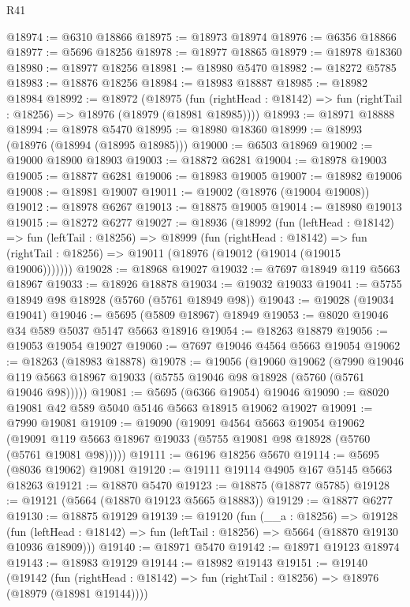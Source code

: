 \begin{lexlean}{R41}
\begin{coremodule}
@18974 := @6310 @18866
@18975 := @18973 @18974
@18976 := @6356 @18866
@18977 := @5696 @18256
@18978 := @18977 @18865
@18979 := @18978 @18360
@18980 := @18977 @18256
@18981 := @18980 @5470
@18982 := @18272 @5785
@18983 := @18876 @18256
@18984 := @18983 @18887
@18985 := @18982 @18984
@18992 := @18972
    (@18975
      (fun (rightHead : @18142) => fun (rightTail : @18256) => @18976 (@18979 (@18981 @18985))))
@18993 := @18971 @18888
@18994 := @18978 @5470
@18995 := @18980 @18360
@18999 := @18993 (@18976 (@18994 (@18995 @18985)))
@19000 := @6503 @18969
@19002 := @19000 @18900 @18903
@19003 := @18872 @6281
@19004 := @18978 @19003
@19005 := @18877 @6281
@19006 := @18983 @19005
@19007 := @18982 @19006
@19008 := @18981 @19007
@19011 := @19002 (@18976 (@19004 @19008))
@19012 := @18978 @6267
@19013 := @18875 @19005
@19014 := @18980 @19013
@19015 := @18272 @6277
@19027 := @18936
    (@18992
      (fun (leftHead : @18142) =>
      fun (leftTail : @18256) =>
      @18999
        (fun (rightHead : @18142) =>
        fun (rightTail : @18256) => @19011 (@18976 (@19012 (@19014 (@19015 @19006)))))))
@19028 := @18968 @19027
@19032 := @7697 @18949 @119 @5663 @18967
@19033 := @18926 @18878
@19034 := @19032 @19033
@19041 := @5755 @18949 @98 @18928 (@5760 (@5761 @18949 @98))
@19043 := @19028 (@19034 @19041)
@19046 := @5695 (@5809 @18967) @18949
@19053 := @8020 @19046 @34 @589 @5037 @5147 @5663 @18916
@19054 := @18263 @18879
@19056 := @19053 @19054 @19027
@19060 := @7697 @19046 @4564 @5663 @19054
@19062 := @18263 (@18983 @18878)
@19078 := @19056
    (@19060
      @19062
      (@7990 @19046 @119 @5663 @18967 @19033 (@5755 @19046 @98 @18928 (@5760 (@5761 @19046 @98)))))
@19081 := @5695 (@6366 @19054) @19046
@19090 := @8020 @19081 @42 @589 @5040 @5146 @5663 @18915 @19062 @19027
@19091 := @7990 @19081
@19109 := @19090
    (@19091
      @4564
      @5663
      @19054
      @19062
      (@19091 @119 @5663 @18967 @19033 (@5755 @19081 @98 @18928 (@5760 (@5761 @19081 @98)))))
@19111 := @6196 @18256 @5670
@19114 := @5695 (@8036 @19062) @19081
@19120 := @19111 @19114 @4905 @167 @5145 @5663 @18263
@19121 := @18870 @5470
@19123 := @18875 (@18877 @5785)
@19128 := @19121 (@5664 (@18870 @19123 @5665 @18883))
@19129 := @18877 @6277
@19130 := @18875 @19129
@19139 := @19120
    (fun (__a : @18256) =>
    @19128
      (fun (leftHead : @18142) => fun (leftTail : @18256) => @5664 (@18870 @19130 @10936 @18909)))
@19140 := @18971 @5470
@19142 := @18971 @19123 @18974
@19143 := @18983 @19129
@19144 := @18982 @19143
@19151 := @19140
    (@19142
      (fun (rightHead : @18142) => fun (rightTail : @18256) => @18976 (@18979 (@18981 @19144))))

\end{coremodule}
\end{lexlean}
